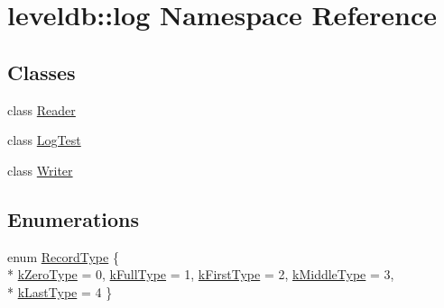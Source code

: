 \hypertarget{namespaceleveldb_1_1log}{\section{leveldb\-:\-:log Namespace Reference}
\label{namespaceleveldb_1_1log}
}
\subsection*{Classes}
\begin{DoxyCompactItemize}
\item 
class \hyperlink{classleveldb_1_1log_1_1_reader}{Reader}
\item 
class \hyperlink{classleveldb_1_1log_1_1_log_test}{Log\-Test}
\item 
class \hyperlink{classleveldb_1_1log_1_1_writer}{Writer}
\end{DoxyCompactItemize}
\subsection*{Enumerations}
\begin{DoxyCompactItemize}
\item 
enum \hyperlink{namespaceleveldb_1_1log_a01bdc1b51beb634f14f8fbb70fbd8d2a}{Record\-Type} \{ \\*
\hyperlink{namespaceleveldb_1_1log_a01bdc1b51beb634f14f8fbb70fbd8d2aa5a96fbcdf2a8be4834c61233ec2cea2e}{k\-Zero\-Type} = 0, 
\hyperlink{namespaceleveldb_1_1log_a01bdc1b51beb634f14f8fbb70fbd8d2aa2c77e6c3871e8ec5506f9f9c2e7dfb13}{k\-Full\-Type} = 1, 
\hyperlink{namespaceleveldb_1_1log_a01bdc1b51beb634f14f8fbb70fbd8d2aa46ff8d418146ec7ce6c3a883e89b48da}{k\-First\-Type} = 2, 
\hyperlink{namespaceleveldb_1_1log_a01bdc1b51beb634f14f8fbb70fbd8d2aa50ec9d5a2236253d02c0abd55d178e08}{k\-Middle\-Type} = 3, 
\\*
\hyperlink{namespaceleveldb_1_1log_a01bdc1b51beb634f14f8fbb70fbd8d2aa29f913fb4d719f97a9618bca93775dfc}{k\-Last\-Type} = 4
 \}
\end{DoxyCompactItemize}
